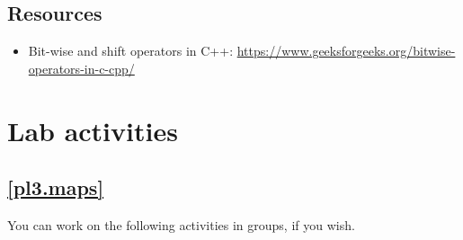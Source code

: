 \documentclass[12pt]{book}
\begin{document}
\subsection{Resources}

\begin{itemize}[label=--]
\item Bit-wise and shift operators in C++: \url{https://www.geeksforgeeks.org/bitwise-operators-in-c-cpp/}
\end{itemize}


\section{Lab activities}

\subsection{\ref{pl3.maps}}

You can work on the following activities in groups, if you wish.
\end{document}

